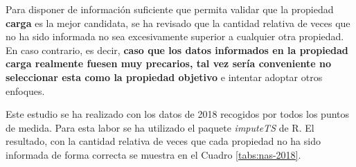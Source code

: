 \documentclass[]{book}
\begin{document}
Para disponer de información suficiente que permita validar que la
propiedad \textbf{carga} es la mejor candidata, se ha revisado que la
cantidad relativa de veces que no ha sido informada no sea excesivamente
superior a cualquier otra propiedad. En caso contrario, es decir,
\textbf{caso que los datos informados en la propiedad carga realmente
fuesen muy precarios, tal vez sería conveniente no seleccionar esta como
la propiedad objetivo} e intentar adoptar otros enfoques.

Este estudio se ha realizado con los datos de 2018 recogidos por todos
los puntos de medida. Para esta labor se ha utilizado el paquete
\emph{imputeTS} \citep{imputeTS2018} de R. El resultado, con la cantidad
relativa de veces que cada propiedad no ha sido informada de forma
correcta se muestra en el Cuadro \ref{tabs:nas-2018}.
\end{document}
